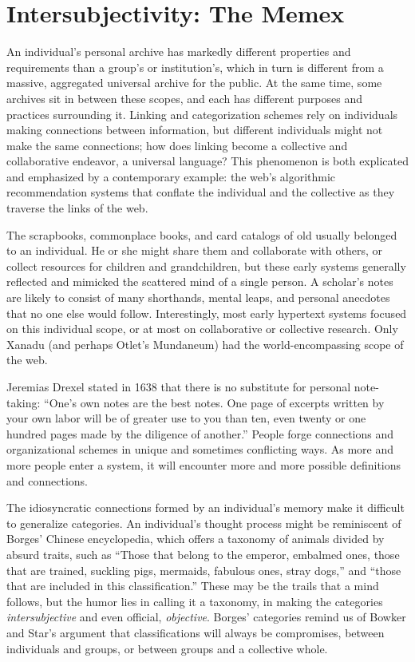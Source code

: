 
\section{Intersubjectivity: The Memex}

An individual's personal archive has markedly different properties and requirements than a group's or institution's, which in turn is different from a massive, aggregated universal archive for the public. At the same time, some archives sit in between these scopes, and each has different purposes and practices surrounding it. Linking and categorization schemes rely on individuals making connections between information, but different individuals might not make the same connections; how does linking become a collective and collaborative endeavor, a universal language? This phenomenon is both explicated and emphasized by a contemporary example: the web's algorithmic recommendation systems that conflate the individual and the collective as they traverse the links of the web.

The scrapbooks, commonplace books, and card catalogs of old usually belonged to an individual. He or she might share them and collaborate with others, or collect resources for children and grandchildren, but these early systems generally reflected and mimicked the scattered mind of a single person. A scholar's notes are likely to consist of many shorthands, mental leaps, and personal anecdotes that no one else would follow. Interestingly, most early hypertext systems focused on this individual scope, or at most on collaborative or collective research. Only Xanadu (and perhaps Otlet's Mundaneum) had the world-encompassing scope of the web.

Jeremias Drexel stated in 1638 that there is no substitute for personal note-taking: ``One's own notes are the best notes. One page of excerpts written by your own labor will be of greater use to you than ten, even twenty or one hundred pages made by the diligence of another.''\autocite{blair_note_2004} People forge connections and organizational schemes in unique and sometimes conflicting ways. As more and more people enter a system, it will encounter more and more possible definitions and connections.

The idiosyncratic connections formed by an individual's memory make it difficult to generalize categories. An individual's thought process might be reminiscent of Borges' Chinese encyclopedia, which offers a taxonomy of animals divided by absurd traits, such as ``Those that belong to the emperor, embalmed ones, those that are trained, suckling pigs, mermaids, fabulous ones, stray dogs,'' and ``those that are included in this classification.''\autocite{borges_analytical_1993} These may be the trails that a mind follows, but the humor lies in calling it a taxonomy, in making the categories \emph{intersubjective} and even official, \emph{objective}. Borges' categories remind us of Bowker and Star's argument that classifications will always be compromises, between individuals and groups, or between groups and a collective whole.

